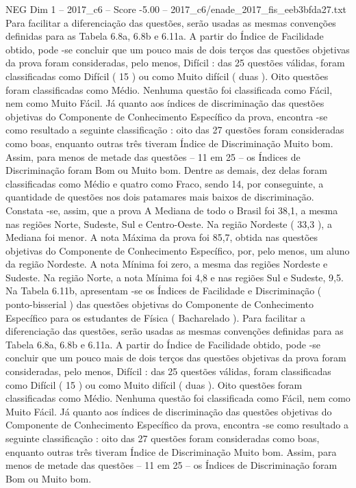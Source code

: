 \begin{textsample}{NEG Dim 1 – 2017\_c6 – Score -5.00 – 2017\_c6/enade\_2017\_fis\_eeb3bfda27.txt}
Para facilitar a diferenciação das questões, serão usadas as mesmas convenções definidas para as Tabela 6.8a, 6.8b e 6.11a.
A partir do Índice de Facilidade obtido, pode -se concluir que um pouco mais de dois terços das questões objetivas da prova foram consideradas, pelo menos, Difícil : das 25 questões válidas, foram classificadas como Difícil ( 15 ) ou como Muito difícil ( duas ).
Oito questões foram classificadas como Médio.
Nenhuma questão foi classificada como Fácil, nem como Muito Fácil.
Já quanto aos índices de discriminação das questões objetivas do Componente de Conhecimento Específico da prova, encontra -se como resultado a seguinte classificação : oito das 27 questões foram consideradas como boas, enquanto outras três tiveram Índice de Discriminação Muito bom.
Assim, para menos de metade das questões – 11 em 25 – os Índices de Discriminação foram Bom ou Muito bom.
Dentre as demais, dez delas foram classificadas como Médio e quatro como Fraco, sendo 14, por conseguinte, a quantidade de questões nos dois patamares mais baixos de discriminação.
Constata -se, assim, que a prova A Mediana de todo o Brasil foi 38,1, a mesma nas regiões Norte, Sudeste, Sul e Centro-Oeste.
Na região Nordeste ( 33,3 ), a Mediana foi menor.
A nota Máxima da prova foi 85,7, obtida nas questões objetivas do Componente de Conhecimento Específico, por, pelo menos, um aluno da região Nordeste.
A nota Mínima foi zero, a mesma das regiões Nordeste e Sudeste.
Na região Norte, a nota Mínima foi 4,8 e nas regiões Sul e Sudeste, 9,5.
Na Tabela 6.11b, apresentam -se os Índices de Facilidade e Discriminação ( ponto-bisserial ) das questões objetivas do Componente de Conhecimento Específico para os estudantes de Física ( Bacharelado ).
Para facilitar a diferenciação das questões, serão usadas as mesmas convenções definidas para as Tabela 6.8a, 6.8b e 6.11a.
A partir do Índice de Facilidade obtido, pode -se concluir que um pouco mais de dois terços das questões objetivas da prova foram consideradas, pelo menos, Difícil : das 25 questões válidas, foram classificadas como Difícil ( 15 ) ou como Muito difícil ( duas ).
Oito questões foram classificadas como Médio.
Nenhuma questão foi classificada como Fácil, nem como Muito Fácil.
Já quanto aos índices de discriminação das questões objetivas do Componente de Conhecimento Específico da prova, encontra -se como resultado a seguinte classificação : oito das 27 questões foram consideradas como boas, enquanto outras três tiveram Índice de Discriminação Muito bom.
Assim, para menos de metade das questões – 11 em 25 – os Índices de Discriminação foram Bom ou Muito bom.

\end{textsample}
